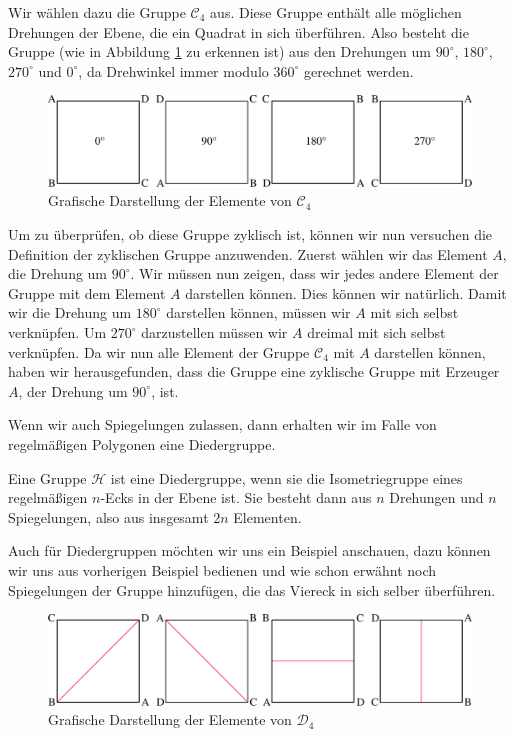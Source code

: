 Wir wählen dazu die Gruppe $\mathcal{C}_4$ aus. Diese Gruppe enthält alle möglichen Drehungen der Ebene, die ein Quadrat in sich überführen. Also besteht die Gruppe (wie in Abbildung \ref{fig:zyklische_gruppe_c4} zu erkennen ist) aus den Drehungen um $90^{\circ}$, $180^{\circ}$, $270^{\circ}$ und $0^{\circ}$, da Drehwinkel immer modulo $360^{\circ}$ gerechnet werden.
\begin{figure}[H]
	\centering
	\includegraphics[width=1\linewidth]{grafiken/zyklische_gruppe_c4}
	\caption{Grafische Darstellung der Elemente von $\mathcal{C}_4$}
	\label{fig:zyklische_gruppe_c4}
\end{figure}
Um zu überprüfen, ob diese Gruppe zyklisch ist, können wir nun versuchen die Definition der zyklischen Gruppe anzuwenden. Zuerst wählen wir das Element $A$, die Drehung um $90^{\circ}$. Wir müssen nun zeigen, dass wir jedes andere Element der Gruppe mit dem Element $A$ darstellen können. Dies können wir natürlich. Damit wir die Drehung um $180^{\circ}$ darstellen können, müssen wir $A$ mit sich selbst verknüpfen. Um $270^{\circ}$ darzustellen müssen wir $A$ dreimal mit sich selbst verknüpfen. Da wir nun alle Element der Gruppe $\mathcal{C}_4$ mit $A$ darstellen können, haben wir herausgefunden, dass die Gruppe eine zyklische Gruppe mit Erzeuger $A$, der Drehung um $90^{\circ}$, ist. \par\smallskip
Wenn wir auch Spiegelungen zulassen, dann erhalten wir im Falle von regelmäßigen Polygonen eine Diedergruppe.
\begin{defi}[Diedergruppe]
	Eine Gruppe $\mathcal{H}$ ist eine Diedergruppe, wenn sie die Isometriegruppe eines regelmäßigen $n$-Ecks in der Ebene ist. Sie besteht dann aus $n$ Drehungen und $n$ Spiegelungen, also aus insgesamt $2n$ Elementen.
\end{defi}
Auch für Diedergruppen möchten wir uns ein Beispiel anschauen, dazu können wir uns aus vorherigen Beispiel bedienen und wie schon erwähnt noch Spiegelungen der Gruppe hinzufügen, die das Viereck in sich selber überführen.
\begin{figure}[H]
	\centering
	\includegraphics[width=1\linewidth]{grafiken/dieder_gruppe}
	\caption{Grafische Darstellung der Elemente von $\mathcal{D}_4$}
	\label{fig:zyklische_gruppe_d4}
\end{figure}
